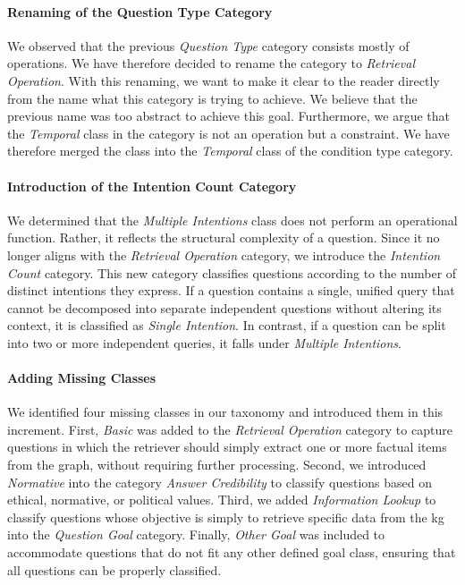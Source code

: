 \paragraph{Renaming of the Question Type Category}
We observed that the previous \emph{Question Type} category consists mostly of operations. We have therefore decided to rename the category to \emph{Retrieval Operation}. With this renaming, we want to make it clear to the reader directly from the name what this category is trying to achieve. We believe that the previous name was too abstract to achieve this goal. Furthermore, we argue that the \emph{Temporal} class in the category is not an operation but a constraint. We have therefore merged the class into the \emph{Temporal} class of the condition type category.

\paragraph{Introduction of the Intention Count Category}
We determined that the \emph{Multiple Intentions} class does not perform an operational function. Rather, it reflects the structural complexity of a question. Since it no longer aligns with the \emph{Retrieval Operation} category, we introduce the \emph{Intention Count} category. This new category classifies questions according to the number of distinct intentions they express. If a question contains a single, unified query that cannot be decomposed into separate independent questions without altering its context, it is classified as \emph{Single Intention}. In contrast, if a question can be split into two or more independent queries, it falls under \emph{Multiple Intentions}.

\paragraph{Adding Missing Classes}
We identified four missing classes in our taxonomy and introduced them in this increment. First, \emph{Basic} was added to the \emph{Retrieval Operation} category to capture questions in which the retriever should simply extract one or more factual items from the graph, without requiring further processing. Second, we introduced \emph{Normative} into the category \emph{Answer Credibility} to classify questions based on ethical, normative, or political values. Third, we added \emph{Information Lookup} to classify questions whose objective is simply to retrieve specific data from the \gls{kg} into the \emph{Question Goal} category. Finally, \emph{Other Goal} was included to accommodate questions that do not fit any other defined goal class, ensuring that all questions can be properly classified.

